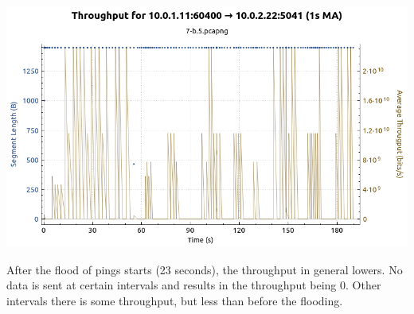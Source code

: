 \includegraphics[width=\textwidth]{traces/7-b_5_throughput}

After the flood of pings starts (23 seconds), the throughput in general lowers. No data is sent at certain intervals and results in the throughput being 0. Other intervals there is some throughput, but less than before the flooding.
